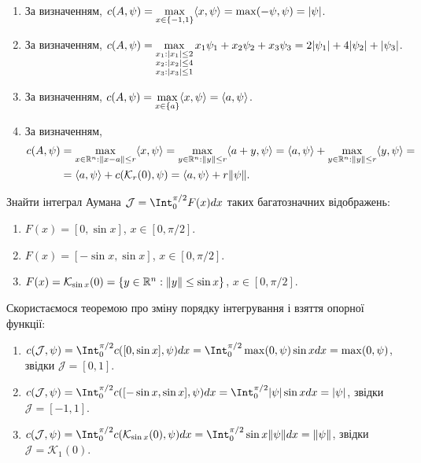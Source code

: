 \begin{solution}
    \begin{enumerate}
        \item За визначенням, $c(A, \psi) = \displaystyle\max\limits_{x \in \{-1, 1\}} \langle x, \psi\rangle = \max(-\psi,\psi) = |\psi|$.
        \item За визначенням, $c(A, \psi) = \displaystyle\max\limits_{\substack{ x_1 : |x_1| \le 2 \\ x_2 : |x_2| \le  4 \\ x_3 : |x_3| \le 1 }} x_1 \psi_1 + x_2 \psi_2 + x_3 \psi_3  = 2 |\psi_1| + 4 |\psi_2| + |\psi_3|$.
        \item За визначенням, $c(A, \psi) = \displaystyle\max\limits_{x \in \{ a \}} \langle x, \psi\rangle = \langle a, \psi\rangle $.
        \item За визначенням, 
        \begin{equation*}
        \begin{aligned}
        c(A, \psi) &= \displaystyle\max\limits_{x \in \mathbb{R}^n : \| x - a \| \le r} \langle x, \psi\rangle = \displaystyle\max\limits_{y \in \mathbb{R}^n : \| y \| \le r} \langle a + y, \psi\rangle = \langle a, \psi\rangle + \displaystyle\max\limits_{y \in \mathbb{R}^n : \| y \| \le r} \langle y, \psi\rangle = \\
        &= \langle a, \psi\rangle + c(\mathcal{K}_r(0), \psi) = \langle a, \psi \rangle + r\|\psi\|.
        \end{aligned}
        \end{equation*}
    \end{enumerate}
\end{solution}

\begin{problem}
    Знайти інтеграл Аумана $\mathcal{J} = \Int_0^{\pi/2} F(x) dx$ таких багатозначних відображень:
    \begin{enumerate}
        \item $F(x) = [0, \sin x]$, $x \in [0, \pi / 2]$.
        \item $F(x) = [-\sin x, \sin x]$, $x \in [0, \pi / 2]$.
        \item $F(x) = \mathcal{K}_{\sin x}(0) = \{ y \in \mathbb{R}^n : \| y \| \le \sin x \}$, $x \in [0, \pi / 2]$.
    \end{enumerate}
\end{problem}

\begin{solution}
    Скористаємося теоремою про зміну порядку інтегрування і взяття опорної функції:
    \begin{enumerate}
        \item $c(\mathcal{J}, \psi) = \Int_0^{\pi/2} c([0, \sin x], \psi) dx = \Int_0^{\pi/2} \max(0, \psi) \sin x dx = \max(0, \psi)$, звідки $\mathcal{J} = [0, 1]$.
        \item $c(\mathcal{J}, \psi) = \Int_0^{\pi/2} c([-\sin x, \sin x], \psi) dx = \Int_0^{\pi/2} |\psi| \sin x dx = |\psi|$, звідки $\mathcal{J} = [-1, 1]$.
        \item $c(\mathcal{J}, \psi) = \Int_0^{\pi/2} c(\mathcal{K}_{\sin x}(0), \psi) dx = \Int_0^{\pi/2} \sin x \|\psi\| dx = \|\psi\|$, звідки $\mathcal{J} = \mathcal{K}_1(0)$. 
    \end{enumerate}
\end{solution}

